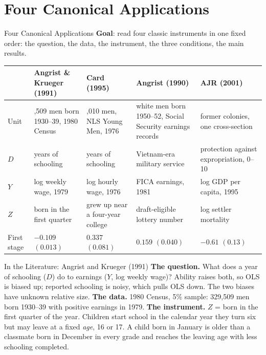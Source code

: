 \documentclass[aspectratio=169,11pt,xcolor=dvipsnames]{beamer}
\begin{document}
\section[Applications]{Four Canonical Applications}
\begin{frame}\sectionpage\end{frame}

\begin{frame}{Four Canonical Applications}
\textbf{Goal}: read four classic instruments in one fixed order: the question,
the data, the instrument, the three conditions, the main results.
\vskip3pt
\begin{center}\scriptsize
\renewcommand{\arraystretch}{1.15}
\begin{tabular}{@{}l>{\raggedright\arraybackslash}p{2.5cm}>{\raggedright\arraybackslash}p{2.7cm}>{\raggedright\arraybackslash}p{2.7cm}>{\raggedright\arraybackslash}p{2.6cm}@{}}
\toprule
 & Angrist \& Krueger (1991) & Card (1995)  & Angrist (1990) & AJR (2001) \\
\midrule
Unit & 329,509 men born 1930--39, 1980 Census & 3,010 men, NLS Young Men, 1976  & white men born 1950--52, Social Security earnings records & 64 former colonies, one cross-section \\
$D$ & years of schooling & years of schooling  & Vietnam-era military service & protection against expropriation, 0--10 \\
$Y$ & log weekly wage, 1979 & log hourly wage, 1976  & FICA earnings, 1981 & log GDP per capita, 1995 \\
$Z$ & born in the first quarter & grew up near a four-year college  & draft-eligible lottery number & log settler mortality \\
First stage & $-0.109$ $(0.013)$ & $0.337$ $(0.081)$  & $0.159$ $(0.040)$ & $-0.61$ $(0.13)$ \\
\bottomrule
\end{tabular}
\end{center}
\end{frame}

\begin{frame}{In the Literature: Angrist and Krueger (1991)}
\textbf{The question.} What does a year of schooling ($D$) do to earnings
($Y$, log weekly wage)? Ability raises both, so OLS is biased up; reported
schooling is noisy, which pulls OLS down. The two biases have unknown
relative size.
\vskip3pt
\textbf{The data.} 1980 Census, 5\% sample: 329,509 men born 1930--39 with
positive earnings in 1979.
\vskip3pt
\textbf{The instrument.} $Z$ = born in the first quarter of the year.
Children start school in the calendar year they turn six but may leave at a
fixed \emph{age}, 16 or 17. A child born in January is older than a classmate
born in December in every grade and reaches the leaving age with less
schooling completed.
\end{frame}
\end{document}
